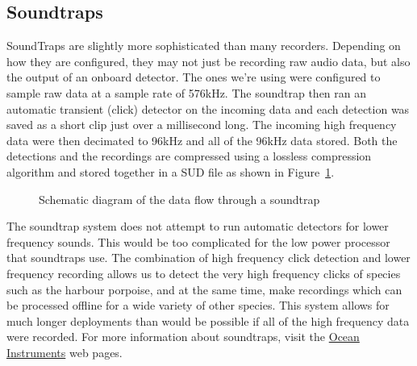 \documentclass[
]{article}
\begin{document}
\subsection{Soundtraps}\label{soundtraps}

SoundTraps are slightly more sophisticated than many recorders.
Depending on how they are configured, they may not just be recording raw
audio data, but also the output of an onboard detector. The ones we're
using were configured to sample raw data at a sample rate of 576kHz. The
soundtrap then ran an automatic transient (click) detector on the
incoming data and each detection was saved as a short clip just over a
millisecond long. The incoming high frequency data were then decimated
to 96kHz and all of the 96kHz data stored. Both the detections and the
recordings are compressed using a lossless compression algorithm and
stored together in a SUD file as shown in
Figure~\ref{fig-soundtrapflow}.

\begin{figure}


\caption{\label{fig-soundtrapflow}Schematic diagram of the data flow
through a soundtrap}

\end{figure}%

The soundtrap system does not attempt to run automatic detectors for
lower frequency sounds. This would be too complicated for the low power
processor that soundtraps use. The combination of high frequency click
detection and lower frequency recording allows us to detect the very
high frequency clicks of species such as the harbour porpoise, and at
the same time, make recordings which can be processed offline for a wide
variety of other species. This system allows for much longer deployments
than would be possible if all of the high frequency data were recorded.
For more information about soundtraps, visit the
\href{https://www.oceaninstruments.co.nz/}{Ocean Instruments} web pages.
\end{document}
